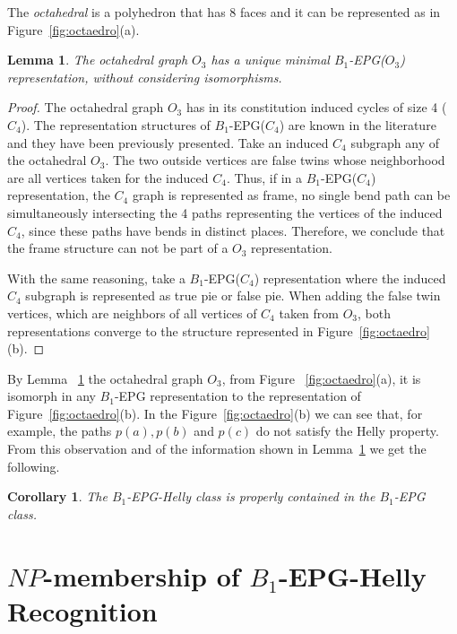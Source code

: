 \documentclass[a4paper,11pt]{article}
\newtheorem{lema}[theorem]{Lemma}
\newtheorem{coro}[theorem]{Corollary}
\begin{document}
The \textit{octahedral} is a polyhedron that has 8 faces and it can be represented as in Figure~\ref{fig:octaedro}(a).

\begin{lema}\label{lem:octaedronaohelly}
The octahedral graph $O_3$ has a unique minimal  $B_1$-EPG($O_3$) representation, without considering isomorphisms.
\end{lema}
\begin{proof}
The octahedral graph $ O_3 $ has in its constitution induced cycles of size 4 ($ C_4 $). The representation structures of $ B_1$-EPG($ C_4 $) are known in the literature and they have been previously presented.
Take an induced $ C_4 $ subgraph  any of the octahedral $ O_3 $. The two outside vertices are false twins whose neighborhood are all vertices taken for the induced $C_4$. Thus, if in a $ B_1$-EPG($C_4 $) representation, the $ C_4 $ graph is represented as frame, no single bend path can be simultaneously intersecting the 4 paths representing the vertices of the induced $ C_4 $, since these paths have bends in distinct places. Therefore, we conclude that the frame structure can not be part of a $ O_3 $ representation.

With the same reasoning, take a $ B_1$-EPG($ C_4 $) representation where the induced $ C_4 $ subgraph is represented as true pie or false pie. When adding the false twin vertices, which are neighbors of all vertices of $ C_4 $ taken from $ O_3 $, both representations converge to the structure represented in Figure~\ref{fig:octaedro}(b). 
\end{proof}



By Lemma ~\ref{lem:octaedronaohelly} the    octahedral graph $ O_3 $, from Figure ~\ref{fig:octaedro}(a), it is isomorph in any $ B_1$-EPG representation to the representation of Figure~\ref{fig:octaedro}(b). In the Figure~\ref{fig:octaedro}(b) we can see that, for example, the paths $ p(a), p(b) $ and $ p(c) $  do not satisfy the Helly property. From this observation and of the information shown in Lemma~\ref{lem:octaedronaohelly} we get the following. %

\begin{coro}\label{coro:b1hellyisinb1}
The $B_1$-EPG-Helly class is properly contained in the $B_1$-EPG class.
\end{coro}

\section{$NP$-membership of $B_1$-EPG-Helly Recognition}
\end{document}
